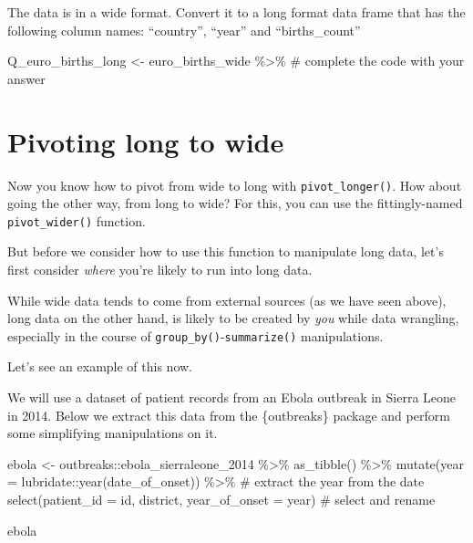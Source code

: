 \documentclass[
  letterpaper,
  DIV=11,
  numbers=noendperiod]{scrreprt}
\newenvironment{Shaded}{\begin{snugshade}}{\end{snugshade}}
\newcommand{\AttributeTok}[1]{\textcolor[rgb]{0.40,0.45,0.13}{#1}}
\newcommand{\CommentTok}[1]{\textcolor[rgb]{0.37,0.37,0.37}{#1}}
\newcommand{\FunctionTok}[1]{\textcolor[rgb]{0.28,0.35,0.67}{#1}}
\newcommand{\NormalTok}[1]{\textcolor[rgb]{0.00,0.23,0.31}{#1}}
\newcommand{\OtherTok}[1]{\textcolor[rgb]{0.00,0.23,0.31}{#1}}
\newcommand{\SpecialCharTok}[1]{\textcolor[rgb]{0.37,0.37,0.37}{#1}}
\begin{document}
\begin{tcolorbox}
The data is in a wide format. Convert it to a long format data frame
that has the following column names: ``country'', ``year'' and
``births\_count''

\begin{Shaded}
\begin{Highlighting}[]
\NormalTok{Q\_euro\_births\_long }\OtherTok{\textless{}{-}} 
\NormalTok{  euro\_births\_wide }\SpecialCharTok{\%\textgreater{}\%} \CommentTok{\# complete the code with your answer}
\end{Highlighting}
\end{Shaded}

\end{tcolorbox}

\section{Pivoting long to wide}\label{pivoting-long-to-wide}

Now you know how to pivot from wide to long with
\texttt{pivot\_longer()}. How about going the other way, from long to
wide? For this, you can use the fittingly-named \texttt{pivot\_wider()}
function.

But before we consider how to use this function to manipulate long data,
let's first consider \emph{where} you're likely to run into long data.

While wide data tends to come from external sources (as we have seen
above), long data on the other hand, is likely to be created by
\emph{you} while data wrangling, especially in the course of
\texttt{group\_by()}-\texttt{summarize()} manipulations.

Let's see an example of this now.

We will use a dataset of patient records from an Ebola outbreak in
Sierra Leone in 2014. Below we extract this data from the \{outbreaks\}
package and perform some simplifying manipulations on it.

\begin{Shaded}
\begin{Highlighting}[]
\NormalTok{ebola }\OtherTok{\textless{}{-}} 
\NormalTok{  outbreaks}\SpecialCharTok{::}\NormalTok{ebola\_sierraleone\_2014 }\SpecialCharTok{\%\textgreater{}\%} 
  \FunctionTok{as\_tibble}\NormalTok{() }\SpecialCharTok{\%\textgreater{}\%} 
  \FunctionTok{mutate}\NormalTok{(}\AttributeTok{year =}\NormalTok{ lubridate}\SpecialCharTok{::}\FunctionTok{year}\NormalTok{(date\_of\_onset)) }\SpecialCharTok{\%\textgreater{}\%} \CommentTok{\# extract the year from the date}
  \FunctionTok{select}\NormalTok{(}\AttributeTok{patient\_id =}\NormalTok{ id, district, }\AttributeTok{year\_of\_onset =}\NormalTok{ year) }\CommentTok{\# select and rename}

\NormalTok{ebola}
\end{Highlighting}
\end{Shaded}
\end{document}
